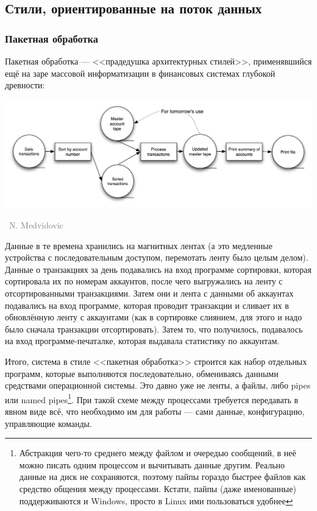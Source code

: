 \documentclass[a5paper]{article}
\newcommand{\attribution}[1] {
    \vspace{-4mm}\begin{flushright}\begin{scriptsize}\textcolor{gray}
    {\textcopyright\, #1}\end{scriptsize}\end{flushright}
}
\begin{document}
\subsection{Стили, ориентированные на поток данных}

\subsubsection{Пакетная обработка}

Пакетная обработка --- <<прадедушка архитектурных стилей>>, применявшийся ещё на заре массовой информатизации в финансовых системах глубокой древности:

\begin{center}
    \includegraphics[width=\textwidth]{batch.png}
    \attribution{N. Medvidovic}
\end{center}

Данные в те времена хранились на магнитных лентах (а это медленные устройства с последовательным доступом, перемотать ленту было целым делом). Данные о транзакциях за день подавались на вход программе сортировки, которая сортировала их по номерам аккаунтов, после чего выгружались на ленту с отсортированными транзакциями. Затем они и лента с данными об аккаунтах подавались на вход программе, которая проводит транзакции и сливает их в обновлённую ленту с аккаунтами (как в сортировке слиянием, для этого и надо было сначала транзакции отсортировать). Затем то, что получилось, подавалось на вход программе-печаталке, которая выдавала статистику по аккаунтам.

Итого, система в стиле <<пакетная обработка>> строится как набор отдельных программ, которые выполняются последовательно, обмениваясь данными средствами операционной системы. Это давно уже не ленты, а файлы, либо pipes или named pipes\footnote{Абстракция чего-то среднего между файлом и очередью сообщений, в неё можно писать одним процессом и вычитывать данные другим. Реально данные на диск не сохраняются, поэтому пайпы гораздо быстрее файлов как средство общения между процессами. Кстати, пайпы (даже именованные) поддерживаются и Windows, просто в Linux ими пользоваться удобнее}. При такой схеме между процессами требуется передавать в явном виде всё, что необходимо им для работы --- сами данные, конфигурацию, управляющие команды.
\end{document}
